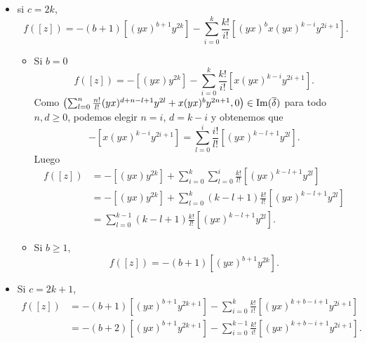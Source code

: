\documentclass[fleqn,../tesis.tex]{subfiles}
\begin{document}
\begin{itemize}
	\item si $c = 2k$,
	\[
		f([z]) = -(b + 1)\left[(yx)^{b + 1}y^{2k}\right] - \sum_{i  = 0}^k\frac{k!}{i!}\left[(yx)^bx(yx)^{k - i}y^{2i + 1}\right].
	\]	
	
	\begin{itemize}
		\item Si $b = 0$
		\[
			f([z]) = -\left[(yx)y^{2k}\right] - \sum_{i  = 0}^k\frac{k!}{i!}\left[x(yx)^{k - i}y^{2i + 1}\right].
		\]
		Como $\left(\sum_{l = 0}^n\frac{n!}{l!}(yx)^{d + n - l + 1}y^{2l} + x(yx)^by^{2n + 1}, 0\right) \in \operatorname{Im}(\overline{\delta})$
		para todo $n,d \geq 0$, podemos elegir $n = i$, $d = k - i$ y obtenemos que 
		\[
			-\left[x(yx)^{k - i}y^{2i + 1}\right] = \sum_{l = 0}^i\frac{i!}{l!}\left[(yx)^{k - l + 1}y^{2l}\right].
		\]
		Luego
		\begin{align*}
			f([z]) &= -\left[(yx)y^{2k}\right] + \sum_{i  = 0}^k\sum_{l = 0}^i\frac{k!}{l!}\left[(yx)^{k - l + 1}y^{2l}\right]\\
			&= -\left[(yx)y^{2k}\right] + \sum_{l = 0}^{k}(k - l + 1)\frac{k!}{l!}\left[(yx)^{k - l + 1}y^{2l}\right]\\
			&= \sum_{l = 0}^{k - 1}(k - l + 1)\frac{k!}{l!}\left[(yx)^{k - l + 1}y^{2l}\right].
		\end{align*}
		\item Si $b \geq 1$,
		\[		
		f([z]) = -(b + 1)\left[(yx)^{b + 1}y^{2k}\right].
		\]	
	\end{itemize}
	\item Si $c = 2k + 1$,
	\begin{align*}
	    f([z]) &= -(b + 1)\left[(yx)^{b + 1}y^{2k + 1}\right] - \sum_{i  = 0}^k\frac{k!}{i!}\left[(yx)^{k + b - i + 1}y^{2i + 1}\right]\\
	    &= -(b + 2)\left[(yx)^{b + 1}y^{2k + 1}\right] - \sum_{i  = 0}^{k - 1}\frac{k!}{i!}\left[(yx)^{k + b - i + 1}y^{2i + 1}\right].
	\end{align*}
\end{itemize}
\end{document}
